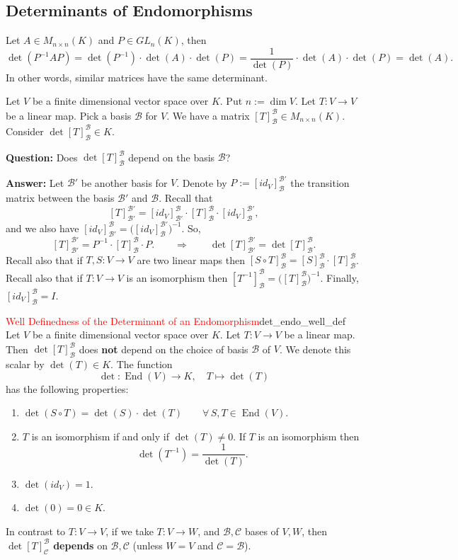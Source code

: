 \subsection{Determinants of Endomorphisms}
Let $A \in M_{n \times n}(K)$ and $P \in GL_n(K)$, then 
\[
	\det(P^{-1} A P) = \det(P^{-1}) \cdot \det(A) \cdot \det(P) = \frac{1}{\det(P)}\cdot \det(A) \cdot \det(P) = \det(A).
\]
In other words, similar matrices have the same determinant.

Let $V$ be a finite dimensional vector space over $K$. Put $n := \dim V$. Let $T:V \to V$ be a linear map. Pick a basis $\mathcal{B}$ for $V$. We have a matrix $[T]^{\mathcal{B}}_{\mathcal{B}} \in M_{n\times n}(K)$. Consider $\det [T]^{\mathcal{B}}_{\mathcal{B}} \in K$.

\textbf{Question:} Does $\det [T]^{\mathcal{B}}_{\mathcal{B}}$ depend on the basis $\mathcal{B}$?

\textbf{Answer:} Let $\mathcal{B}'$ be another basis for $V$. Denote by $P := [id_V]^{\mathcal{B}'}_{\mathcal{B}}$ the transition matrix between the basis $\mathcal{B}'$ and $\mathcal{B}$. Recall that
\[
	[T]^{\mathcal{B}'}_{\mathcal{B}'} = [id_V]^{\mathcal{B}}_{\mathcal{B}'} \cdot [T]^{\mathcal{B}}_{\mathcal{B}} \cdot [id_V]^{\mathcal{B}'}_{\mathcal{B}},
\]
and we also have $[id_V]^{\mathcal{B}}_{\mathcal{B}'} = \big([id_V]^{\mathcal{B}'}_{\mathcal{B}}\big)^{-1}$. So, 
\[
	[T]^{\mathcal{B}'}_{\mathcal{B}'} = P^{-1} \cdot [T]^{\mathcal{B}}_{\mathcal{B}} \cdot P. \qquad \Longrightarrow \qquad \det [T]^{\mathcal{B}'}_{\mathcal{B}'} = \det [T]^{\mathcal{B}}_{\mathcal{B}}.
\]
Recall also that if $T, S:V \to V$ are two linear maps then $[S \circ T]^{\mathcal{B}}_{\mathcal{B}} = [S]^{\mathcal{B}}_{\mathcal{B}} \cdot [T]^{\mathcal{B}}_{\mathcal{B}}$. Recall also that if $T:V \to V$ is an isomorphism then $[T^{-1}]^{\mathcal{B}}_{\mathcal{B}} = \big([T]^{\mathcal{B}}_{\mathcal{B}}\big)^{-1}$. Finally, $[id_V]^{\mathcal{B}}_{\mathcal{B}} = I$.

\begin{corollary}{\textcolor{red}{Well Definedness of the Determinant of an Endomorphism}}{det_endo_well_def}
	Let $V$ be a finite dimensional vector space over $K$. Let $T:V \to V$ be a linear map. Then $\det [T]^{\mathcal{B}}_{\mathcal{B}}$ does \textbf{not} depend on the choice of basis $\mathcal{B}$ of $V$. We denote this scalar by $\det(T) \in K$. The function
	\[
		\det: \operatorname{End}(V) \to K, \quad T \mapsto \det(T)
	\]
	has the following properties:
	\begin{enumerate}
		\item $\det(S \circ T) = \det(S) \cdot \det(T) \qquad \forall \, S, T \in \operatorname{End}(V)$.
		\item $T$ is an isomorphism if and only if $\det(T) \neq 0$. If $T$ is an isomorphism then 
		\[
			\det(T^{-1}) = \frac{1}{\det(T)}.
		\]
		\item $\det(id_V) = 1$.
		\item $\det(0) = 0 \in K$.
	\end{enumerate}
\end{corollary}

\begin{remark}
	In contrast to $T:V \to V$, if we take $T:V \to W$, and $\mathcal{B}, \mathcal{C}$ bases of $V, W$, then $\det [T]^{\mathcal{B}}_{\mathcal{C}}$ \textbf{depends} on $\mathcal{B}, \mathcal{C}$ (unless $W = V$ and $\mathcal{C} = \mathcal{B}$).
\end{remark}